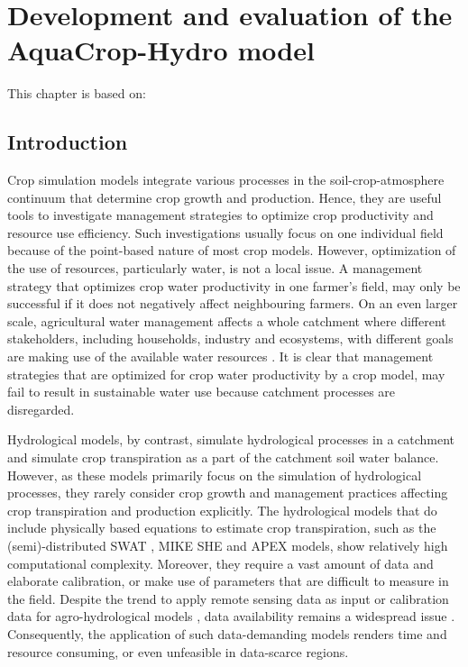 \chapter{Development and evaluation of the AquaCrop-Hydro model}
\label{ch:aquacrophydro}

This chapter is based on:\\

\section{Introduction} 
Crop simulation models integrate various processes in the soil-crop-atmosphere continuum that determine crop growth and production. Hence, they are useful tools to investigate management strategies to optimize crop productivity and resource use efficiency. Such investigations usually focus on one individual field because of the point-based nature of most crop models. However, optimization of the use of resources, particularly water, is not a local issue. A management strategy that optimizes crop water productivity in one farmer's field, may only be successful if it does not negatively affect neighbouring farmers. On an even larger scale, agricultural water management affects a whole catchment where different stakeholders, including households, industry and ecosystems, with different goals are making use of the available water resources \parencite{bergez2012}. It is clear that management strategies that are optimized for crop water productivity by a crop model, may fail to result in sustainable water use because catchment processes are disregarded. 

Hydrological models, by contrast, simulate hydrological processes in a catchment and simulate crop transpiration as a part of the catchment soil water balance. However, as these models primarily focus on the simulation of hydrological processes, they rarely consider crop growth and management practices affecting crop transpiration and production explicitly. The hydrological models that do include physically based equations to estimate crop transpiration, such as the (semi)-distributed SWAT \parencite{arnold1998a,douglasmankin2010}, MIKE SHE \parencite{refsgaard1995} and APEX \parencite{gassman2010} models, show relatively high computational complexity. Moreover, they require a vast amount of data and elaborate calibration, or make use of parameters that are difficult to measure in the field. Despite the trend to apply remote sensing data as input or calibration data for agro-hydrological models \parencite{boegh2004, moulin1998}, data availability remains a widespread issue \parencite{grayson2002}. Consequently, the application of such data-demanding models renders time and resource consuming, or even unfeasible in data-scarce regions. 

